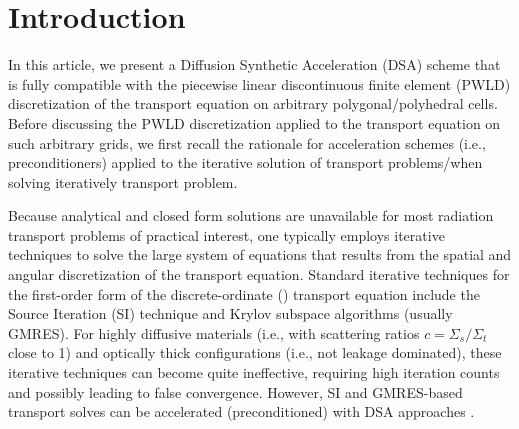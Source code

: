 \section{Introduction}

In this article, we present a Diffusion Synthetic Acceleration (DSA) scheme
that is fully compatible with the piecewise linear discontinuous finite
element (PWLD) discretization of the transport equation on arbitrary
polygonal/polyhedral cells. Before discussing the PWLD discretization applied
to the transport equation on such arbitrary grids, we first recall the
rationale for acceleration schemes (i.e., preconditioners) applied to the
iterative solution of transport problems/when solving iteratively transport
problem.


Because analytical and closed form solutions are unavailable for most
radiation transport problems of practical interest, one typically employs
iterative techniques to solve the large system of equations that results from
the spatial and angular discretization of the transport equation. Standard
iterative techniques for the first-order form of the discrete-ordinate (\sn)
transport equation include the Source Iteration (SI) technique and Krylov 
subspace algorithms (usually GMRES). For highly diffusive materials (i.e., 
with scattering ratios $c=\Sigma_s / \Sigma_t $ close to 1) and optically 
thick configurations (i.e., not leakage dominated), these iterative techniques 
can become quite ineffective, requiring high iteration counts and possibly 
leading to false convergence. However, SI and GMRES-based transport solves 
can be accelerated (preconditioned) with DSA approaches 
\cite{dsa_ref,larsen_dsa,consistent_p1,m4s,wla,mip}. 


